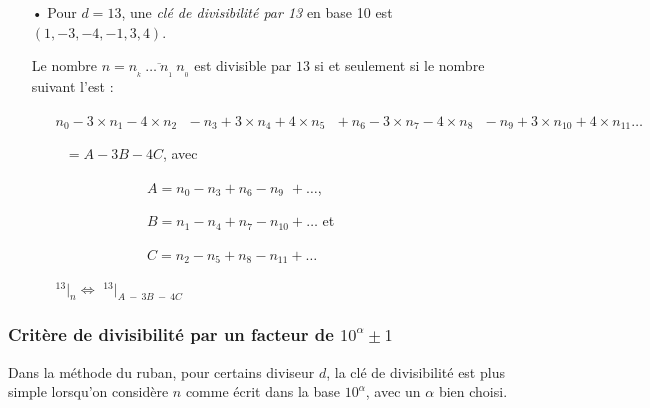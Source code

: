 \documentclass[a4paper]{article}
\begin{document}
\begin{small}
\begin{itemize}
	\vspace{0.5cm}
	
	\item[•] Pour $d = 13$, une \textit{clé de divisibilité par 13} en base 10 est $(1, -3, -4, -1, 3, 4)$.
	
	\vspace{0.2cm}
	
	Le nombre $n = \overline{n_{_{k}}~\dots~n_{_1}~n_{_0}}$ est divisible par $13$ si et seulement si le nombre suivant l'est :
	
	\vspace{0.2cm}
	
	\begin{itemize}
		\item[] $n_0 - 3 \times n_1 - 4 \times n_2 ~~~ - n_3 + 3 \times n_4 + 4 \times n_5 ~~~ + n_6 - 3 \times n_7 - 4 \times n_8 ~~~ - n_9 + 3 \times n_{10} + 4 \times n_{11}\dots$ 
		\item[] $~~~ = A - 3B - 4C$, avec 
		
		\begin{itemize}
			\item[] ~~~~~~~~~ $A = n_0 - n_3 + n_6 - n_{9\phantom{0}}    + \dots$, 
			\item[] ~~~~~~~~~ $B = n_1 - n_4 + n_7 - n_{10} + \dots$ 	et  	
			\item[] ~~~~~~~~~ $C = n_2 - n_5 + n_8 - n_{11} + \dots$
		\end{itemize}
		
		\vspace{0.2cm}		
		
		\item[] {\Large $ ^{13}|_n \Leftrightarrow$ $^{13}|_{A~-~3B~-~4C} $}\\
		
	\end{itemize}
	

\end{itemize}
\end{small}

\pagebreak







\subsubsection*{Critère de divisibilité par un facteur de {\boldmath $10^\alpha ± 1$}}\label{subsection_critere_10_plus_ou_moins_1}

	Dans la méthode du ruban, pour certains diviseur $d$, la clé de divisibilité est plus simple lorsqu'on considère $n$ comme écrit dans la base $10^\alpha$, avec un $\alpha$ bien choisi.\\
\end{document}
